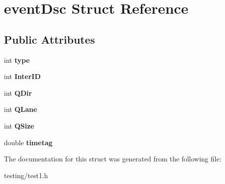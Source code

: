 \hypertarget{structevent_dsc}{\section{event\-Dsc Struct Reference}
\label{structevent_dsc}
}
\subsection*{Public Attributes}
\begin{DoxyCompactItemize}
\item 
\hypertarget{structevent_dsc_a7de878b8aa351b4e60a4dedeffc72ac8}{int {\bfseries type}}\label{structevent_dsc_a7de878b8aa351b4e60a4dedeffc72ac8}

\item 
\hypertarget{structevent_dsc_a2310f1f76d4c059159d28ca2b5fe6b4d}{int {\bfseries Inter\-I\-D}}\label{structevent_dsc_a2310f1f76d4c059159d28ca2b5fe6b4d}

\item 
\hypertarget{structevent_dsc_a382b2e111683f5fb926daf3c1dddd819}{int {\bfseries Q\-Dir}}\label{structevent_dsc_a382b2e111683f5fb926daf3c1dddd819}

\item 
\hypertarget{structevent_dsc_aa898dbf105b9237a5a9ee9af19ca8414}{int {\bfseries Q\-Lane}}\label{structevent_dsc_aa898dbf105b9237a5a9ee9af19ca8414}

\item 
\hypertarget{structevent_dsc_a62797134a94e01b72874af3d4974589e}{int {\bfseries Q\-Size}}\label{structevent_dsc_a62797134a94e01b72874af3d4974589e}

\item 
\hypertarget{structevent_dsc_a88587beaba3370682ffca5a45c6ab87b}{double {\bfseries timetag}}\label{structevent_dsc_a88587beaba3370682ffca5a45c6ab87b}

\end{DoxyCompactItemize}


The documentation for this struct was generated from the following file\-:\begin{DoxyCompactItemize}
\item 
testing/test1.\-h\end{DoxyCompactItemize}
